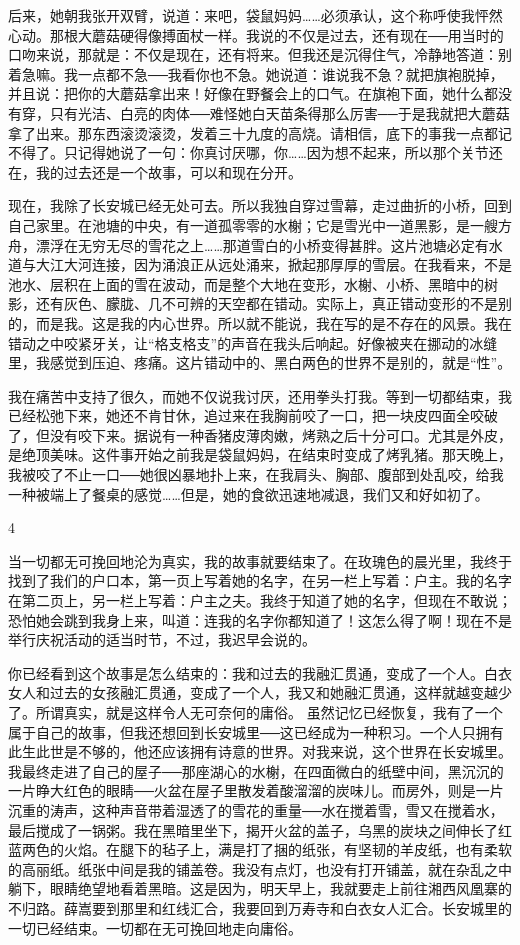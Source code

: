 后来，她朝我张开双臂，说道：来吧，袋鼠妈妈……必须承认，这个称呼使我怦然心动。那根大蘑菇硬得像搏面杖一样。我说的不仅是过去，还有现在──用当时的口吻来说，那就是：不仅是现在，还有将来。但我还是沉得住气，冷静地答道：别着急嘛。我一点都不急──我看你也不急。她说道：谁说我不急？就把旗袍脱掉，并且说：把你的大蘑菇拿出来！好像在野餐会上的口气。在旗袍下面，她什么都没有穿，只有光洁、白亮的肉体──难怪她白天苗条得那么厉害──于是我就把大蘑菇拿了出来。那东西滚烫滚烫，发着三十九度的高烧。请相信，底下的事我一点都记不得了。只记得她说了一句：你真讨厌哪，你……因为想不起来，所以那个关节还在，我的过去还是一个故事，可以和现在分开。 

现在，我除了长安城已经无处可去。所以我独自穿过雪幕，走过曲折的小桥，回到自己家里。在池塘的中央，有一道孤零零的水榭；它是雪光中一道黑影，是一艘方舟，漂浮在无穷无尽的雪花之上……那道雪白的小桥变得甚胖。这片池塘必定有水道与大江大河连接，因为涌浪正从远处涌来，掀起那厚厚的雪层。在我看来，不是池水、层积在上面的雪在波动，而是整个大地在变形，水榭、小桥、黑暗中的树影，还有灰色、朦胧、几不可辨的天空都在错动。实际上，真正错动变形的不是别的，而是我。这是我的内心世界。所以就不能说，我在写的是不存在的风景。我在错动之中咬紧牙关，让“格支格支”的声音在我头后响起。好像被夹在挪动的冰缝里，我感觉到压迫、疼痛。这片错动中的、黑白两色的世界不是别的，就是“性”。 

我在痛苦中支持了很久，而她不仅说我讨厌，还用拳头打我。等到一切都结束，我已经松弛下来，她还不肯甘休，追过来在我胸前咬了一口，把一块皮四面全咬破了，但没有咬下来。据说有一种香猪皮薄肉嫩，烤熟之后十分可口。尤其是外皮，是绝顶美味。这件事开始之前我是袋鼠妈妈，在结束时变成了烤乳猪。那天晚上，我被咬了不止一口──她很凶暴地扑上来，在我肩头、胸部、腹部到处乱咬，给我一种被端上了餐桌的感觉……但是，她的食欲迅速地减退，我们又和好如初了。 

4 

当一切都无可挽回地沦为真实，我的故事就要结束了。在玫瑰色的晨光里，我终于找到了我们的户口本，第一页上写着她的名字，在另一栏上写着：户主。我的名字在第二页上，另一栏上写着：户主之夫。我终于知道了她的名字，但现在不敢说；恐怕她会跳到我身上来，叫道：连我的名字你都知道了！这怎么得了啊！现在不是举行庆祝活动的适当时节，不过，我迟早会说的。 

你已经看到这个故事是怎么结束的：我和过去的我融汇贯通，变成了一个人。白衣女人和过去的女孩融汇贯通，变成了一个人，我又和她融汇贯通，这样就越变越少了。所谓真实，就是这样令人无可奈何的庸俗。 虽然记忆已经恢复，我有了一个属于自己的故事，但我还想回到长安城里──这已经成为一种积习。一个人只拥有此生此世是不够的，他还应该拥有诗意的世界。对我来说，这个世界在长安城里。我最终走进了自己的屋子──那座湖心的水榭，在四面微白的纸壁中间，黑沉沉的一片睁大红色的眼睛──火盆在屋子里散发着酸溜溜的炭味儿。而房外，则是一片沉重的涛声，这种声音带着湿透了的雪花的重量──水在搅着雪，雪又在搅着水，最后搅成了一锅粥。我在黑暗里坐下，揭开火盆的盖子，乌黑的炭块之间伸长了红蓝两色的火焰。在腿下的毡子上，满是打了捆的纸张，有坚韧的羊皮纸，也有柔软的高丽纸。纸张中间是我的铺盖卷。我没有点灯，也没有打开铺盖，就在杂乱之中躺下，眼睛绝望地看着黑暗。这是因为，明天早上，我就要走上前往湘西风凰寨的不归路。薛嵩要到那里和红线汇合，我要回到万寿寺和白衣女人汇合。长安城里的一切已经结束。一切都在无可挽回地走向庸俗。
